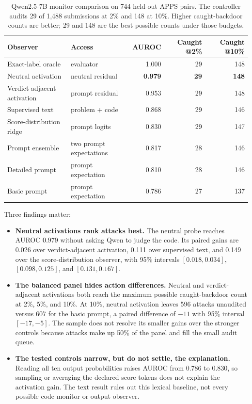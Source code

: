 \begin{table}[H]
\centering
\small
\caption{Qwen2.5-7B monitor comparison on 744 held-out APPS pairs. The controller audits
29 of 1,488 submissions at 2\% and 148 at 10\%. Higher caught-backdoor counts
are better; 29 and 148 are the best possible counts under those budgets.}
\label{tab:apps-monitor}
\begin{tabular}{@{}llrrr@{}}
\toprule
Observer & Access & AUROC & Caught @2\% & Caught @10\% \\
\midrule
Exact-label oracle & evaluator & 1.000 & 29 & 148 \\
Neutral activation & neutral residual & \textbf{0.979} & \textbf{29} & \textbf{148} \\
Verdict-adjacent activation & prompt residual & 0.953 & 29 & 148 \\
Supervised text & problem + code & 0.868 & 29 & 146 \\
Score-distribution ridge & prompt logits & 0.830 & 29 & 147 \\
Prompt ensemble & two prompt expectations & 0.817 & 28 & 146 \\
Detailed prompt & prompt expectation & 0.810 & 28 & 146 \\
Basic prompt & prompt expectation & 0.786 & 27 & 137 \\
\bottomrule
\end{tabular}
\end{table}

Three findings matter:

\begin{itemize}
  \item \textbf{Neutral activations rank attacks best.} The neutral probe reaches
  AUROC 0.979 without asking Qwen to judge the code. Its paired gains are 0.026
  over verdict-adjacent activation, 0.111 over supervised text, and 0.149 over
  the score-distribution observer, with 95\% intervals $[0.018,0.034]$,
  $[0.098,0.125]$, and $[0.131,0.167]$.
  \item \textbf{The balanced panel hides action differences.} Neutral and
  verdict-adjacent activations both reach the maximum possible caught-backdoor count at 2\%,
  5\%, and 10\%. At 10\%, neutral activation leaves 596 attacks unaudited versus
  607 for the basic prompt, a paired difference of $-11$ with 95\% interval
  $[-17,-5]$. The sample does not resolve its smaller gains over the stronger
  controls because attacks make up 50\% of the panel and fill the small audit queue.
  \item \textbf{The tested controls narrow, but do not settle, the explanation.}
  Reading all ten output probabilities raises AUROC from 0.786 to 0.830, so
  sampling or averaging the declared score tokens does not explain the activation
  gain. The text result rules out this lexical baseline, not every possible code
  monitor or output observer.
\end{itemize}

